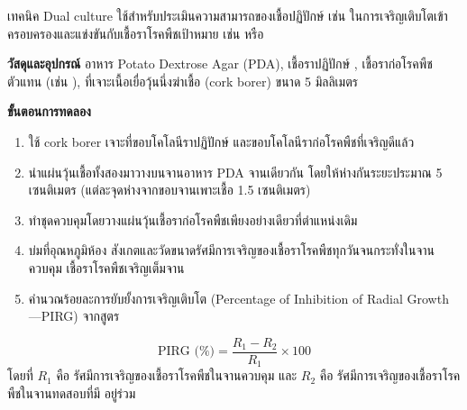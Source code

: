 เทคนิค Dual culture ใช้สำหรับประเมินความสามารถของเชื้อปฏิปักษ์ เช่น  ในการเจริญเติบโตเข้าครอบครองและแข่งขันกับเชื้อราโรคพืชเป้าหมาย เช่น  หรือ 

\begin{labprotocol}
\textbf{วัสดุและอุปกรณ์} อาหาร Potato Dextrose Agar (PDA), เชื้อราปฏิปักษ์ , เชื้อราก่อโรคพืชตัวแทน (เช่น ), ที่เจาะเนื้อเยื่อวุ้นนึ่งฆ่าเชื้อ (cork borer) ขนาด 5 มิลลิเมตร

\textbf{ขั้นตอนการทดลอง}
\begin{enumerate}
    \item ใช้ cork borer เจาะที่ขอบโคโลนีราปฏิปักษ์ และขอบโคโลนีราก่อโรคพืชที่เจริญดีแล้ว
    \item นำแผ่นวุ้นเชื้อทั้งสองมาวางบนจานอาหาร PDA จานเดียวกัน โดยให้ห่างกันระยะประมาณ 5 เซนติเมตร (แต่ละจุดห่างจากขอบจานเพาะเชื้อ 1.5 เซนติเมตร)
    \item ทำชุดควบคุมโดยวางแผ่นวุ้นเชื้อราก่อโรคพืชเพียงอย่างเดียวที่ตำแหน่งเดิม
    \item บ่มที่อุณหภูมิห้อง สังเกตและวัดขนาดรัศมีการเจริญของเชื้อราโรคพืชทุกวันจนกระทั่งในจานควบคุม เชื้อราโรคพืชเจริญเต็มจาน
    \item คำนวณร้อยละการยับยั้งการเจริญเติบโต (Percentage of Inhibition of Radial Growth —PIRG) จากสูตร
\end{enumerate}

\begin{equation}
\text{PIRG (\%)} = \frac{R_1 - R_2}{R_1} \times 100
\end{equation}
โดยที่ $R_1$ คือ รัศมีการเจริญของเชื้อราโรคพืชในจานควบคุม และ $R_2$ คือ รัศมีการเจริญของเชื้อราโรคพืชในจานทดสอบที่มี  อยู่ร่วม
\end{labprotocol}
